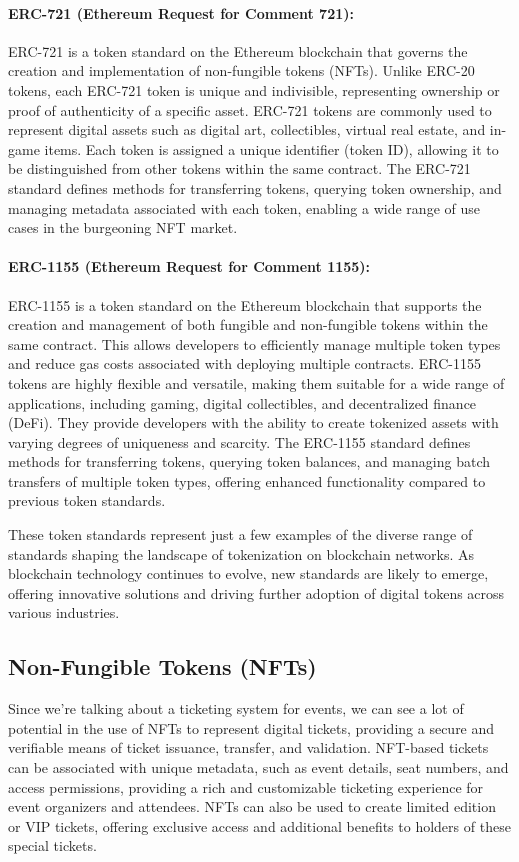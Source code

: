 \paragraph{ERC-721 (Ethereum Request for Comment 721):}
ERC-721 is a token standard on the Ethereum blockchain that governs the
creation and implementation of non-fungible tokens (NFTs). Unlike ERC-20
tokens, each ERC-721 token is unique and indivisible, representing ownership or
proof of authenticity of a specific asset. ERC-721 tokens are commonly used to
represent digital assets such as digital art, collectibles, virtual real
estate, and in-game items. Each token is assigned a unique identifier (token
ID), allowing it to be distinguished from other tokens within the same
contract. The ERC-721 standard defines methods for transferring tokens,
querying token ownership, and managing metadata associated with each token,
enabling a wide range of use cases in the burgeoning NFT market.

\paragraph{ERC-1155 (Ethereum Request for Comment 1155):}
ERC-1155 is a token standard on the Ethereum blockchain that supports the
creation and management of both fungible and non-fungible tokens within the
same contract. This allows developers to efficiently manage multiple token
types and reduce gas costs associated with deploying multiple contracts.
ERC-1155 tokens are highly flexible and versatile, making them suitable for a
wide range of applications, including gaming, digital collectibles, and
decentralized finance (DeFi). They provide developers with the ability to
create tokenized assets with varying degrees of uniqueness and scarcity. The
ERC-1155 standard defines methods for transferring tokens, querying token
balances, and managing batch transfers of multiple token types, offering
enhanced functionality compared to previous token standards.

These token standards represent just a few examples of the diverse range of
standards shaping the landscape of tokenization on blockchain networks. As
blockchain technology continues to evolve, new standards are likely to emerge,
offering innovative solutions and driving further adoption of digital tokens
across various industries.

\subsection{Non-Fungible Tokens (NFTs)}
\label{subsec:nfts}

Since we're talking about a ticketing system for events, we can see a lot of
potential in the use of NFTs to represent digital tickets, providing a secure
and verifiable means of ticket issuance, transfer, and validation. NFT-based
tickets can be associated with unique metadata, such as event details, seat
numbers, and access permissions, providing a rich and customizable ticketing
experience for event organizers and attendees. NFTs can also be used to create
limited edition or VIP tickets, offering exclusive access and additional
benefits to holders of these special tickets.
